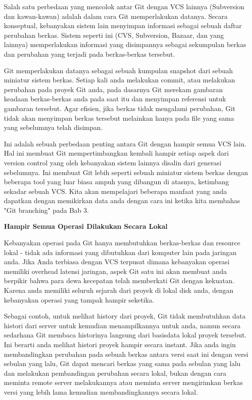 Salah satu perbedaan yang mencolok antar Git dengan VCS lainnya 
(Subversion dan kawan-kawan) adalah dalam cara Git memperlakukan 
datanya. Secara konseptual, kebanyakan sistem lain menyimpan informasi 
sebagai sebuah daftar perubahan berkas. Sistem seperti ini (CVS, 
Subversion, Bazaar, dan yang lainnya) memperlakukan informasi yang 
disimpannya sebagai sekumpulan berkas dan perubahan yang terjadi pada 
berkas-berkas tersebut.\vspace{12pt}

Git memperlakukan datanya sebagai sebuah kumpulan snapshot dari sebuah 
miniatur sistem berkas. Setiap kali anda melakukan commit, atau 
melakukan perubahan pada proyek Git anda, pada dasarnya Git merekam 
gambaran keadaan berkas-berkas anda pada saat itu dan menyimpan 
referensi untuk gambaran tersebut. Agar efisien, jika berkas tidak 
mengalami perubahan, Git tidak akan menyimpan berkas tersebut melainkan 
hanya pada file yang sama yang sebelumnya telah disimpan.\vspace{12pt}

Ini adalah sebuah perbedaan penting antara Git dengan hampir semua VCS 
lain. Hal ini membuat Git mempertimbangkan kembali hampir setiap aspek 
dari version control yang oleh kebanyakan sistem lainnya disalin dari 
generasi sebelumnya. Ini membuat Git lebih seperti sebuah miniatur 
sistem berkas dengan beberapa tool yang luar biasa ampuh yang dibangun 
di atasnya, ketimbang sekadar sebuah VCS. Kita akan mempelajari beberapa 
manfaat yang anda dapatkan dengan memikirkan data anda dengan cara ini 
ketika kita membahas "Git branching" pada Bab 3.\vspace{12pt}

\textbf{Hampir Semua Operasi Dilakukan Secara Lokal}\vspace{12pt}

Kebanyakan operasi pada Git hanya membutuhkan berkas-berkas dan resource 
lokal - tidak ada informasi yang dibutuhkan dari komputer lain pada 
jaringan anda. Jika Anda terbiasa dengan VCS terpusat dimana kebanyakan 
operasi memiliki overhead latensi jaringan, aspek Git satu ini akan 
membuat anda berpikir bahwa para dewa kecepatan telah memberkati Git 
dengan kekuatan. Karena anda memiliki seluruh sejarah dari proyek di 
lokal disk anda, dengan kebanyakan operasi yang tampak hampir seketika.\vspace{12pt}

Sebagai contoh, untuk melihat history dari proyek, Git tidak membutuhkan 
data histori dari server untuk kemudian menampilkannya untuk anda, namun 
secara sedarhana Git membaca historinya langsung dari basisdata lokal 
proyek tersebut. Ini berarti anda melihat histori proyek hampir secara 
instant. Jika anda ingin membandingkan perubahan pada sebuah berkas 
antara versi saat ini dengan versi sebulan yang lalu, Git dapat mencari 
berkas yang sama pada sebulan yang lalu dan melakukan pembandingan 
perubahan secara lokal, bukan dengan cara meminta remote server 
melakukannya atau meminta server mengirimkan berkas versi yang lebih 
lama kemudian membandingkannya secara lokal.\vspace{12pt}

